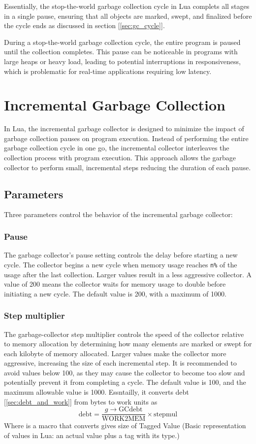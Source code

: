 \documentclass[10pt]{article}
\begin{document}
  Essentially, the stop-the-world garbage collection cycle in Lua complets all stages in a single pause, ensuring that all objects are marked, swept, and finalized before the cycle ends as discussed in section [\ref{sec:gc_cycle}]. 
  
  During a stop-the-world garbage collection cycle, the entire program is paused until the collection completes. This pause can be noticeable in programs with large heaps or heavy load, leading to potential interruptions in responsiveness, which is problematic for real-time applications requiring low latency.



\section{Incremental Garbage Collection} \label{sec:incremental_gc}
In Lua, the incremental garbage collector is designed to minimize the impact of garbage collection pauses on program execution. Instead of performing the entire garbage collection cycle in one go, the incremental collector interleaves the collection process with program execution. This approach allows the garbage collector to perform small, incremental steps reducing the duration of each pause.
\subsection{Parameters}
Three parameters control the behavior of the incremental garbage collector:
\subsubsection{Pause} \label{sec:pause}
The garbage collector's pause setting controls the delay before starting a new cycle. The collector begins a new cycle when memory usage reaches \texttt{n\%} of the usage after the last collection. Larger values result in a less aggressive collector. A value of 200 means the collector waits for memory usage to double before initiating a new cycle. The default value is 200, with a maximum of 1000.
\subsubsection{Step multiplier} \label{sec:step_multiplier}
The garbage-collector step multiplier controls the speed of the collector relative to memory allocation by determining how many elements are marked or swept for each kilobyte of memory allocated. Larger values make the collector more aggressive, increasing the size of each incremental step. It is recommended to avoid values below 100, as they may cause the collector to become too slow and potentially prevent it from completing a cycle. The default value is 100, and the maximum allowable value is 1000. Essntailly, it converts debt [\ref{sec:debt_and_work}] from bytes to work units as
\begin{equation}
  \text{debt} = \frac{g \rightarrow \text{GCdebt}}{\text{WORK2MEM}}\times{\text{stepmul}}
\end{equation}
Where  is a macro that converts gives size of Tagged Value (Basic representation of values in Lua: an actual value plus a tag with its type.)
\end{document}
